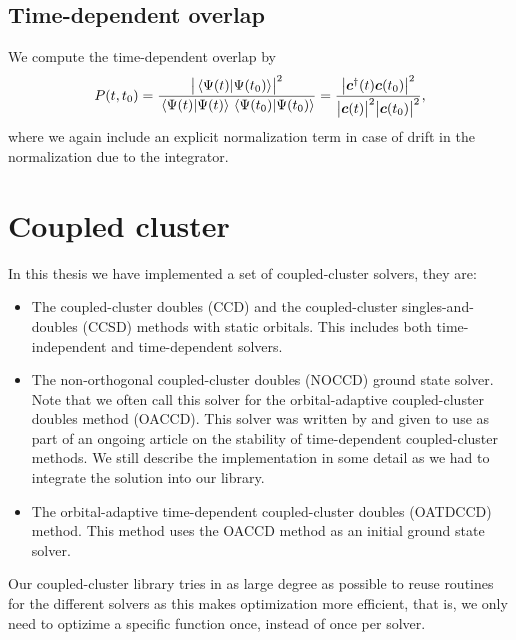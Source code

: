         \subsection{Time-dependent overlap}
            We compute the time-dependent overlap by
            \begin{align}
                P(t, t_0)
                =
                \frac{
                    \abs{\braket*{\Psi(t)}{\Psi(t_0)}}^2
                }{
                    \braket*{\Psi(t)}\braket*{\Psi(t_0)}
                }
                = \frac{
                    \abs{\boldsymbol{c}^{\dagger}(t)\boldsymbol{c}(t_0)}^2
                }{
                    \abs{\boldsymbol{c}(t)}^2
                    \abs{\boldsymbol{c}(t_0)}^2
                },
            \end{align}
            where we again include an explicit normalization term in case of
            drift in the normalization due to the integrator.

    \section{Coupled cluster}
        \label{sec:cc-solver}
        In this thesis we have implemented a set of coupled-cluster solvers,
        they are:
        \begin{itemize}
            \item The coupled-cluster doubles (CCD) and the coupled-cluster
                singles-and-doubles (CCSD) methods with static orbitals.
                This includes both time-independent and time-dependent solvers.
            \item The non-orthogonal coupled-cluster doubles (NOCCD) ground
                state solver.
                Note that we often call this solver for the orbital-adaptive
                coupled-cluster doubles method (OACCD).
                This solver was written by \citeauthor{rolf-nocc}
                \cite{rolf-nocc} and given to use as part of an ongoing article
                on the stability of time-dependent coupled-cluster methods.
                We still describe the implementation in some detail as we had to
                integrate the solution into our library.
            \item The orbital-adaptive time-dependent coupled-cluster doubles
                (OATDCCD) method.
                This method uses the OACCD method as an initial ground state
                solver.
        \end{itemize}
        Our coupled-cluster library tries in as large degree as possible to
        reuse routines for the different solvers as this makes optimization
        more efficient, that is, we only need to optizime a specific function
        once, instead of once per solver.

